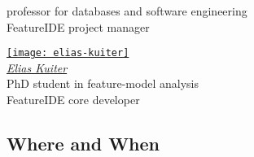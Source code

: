 \begin{frame}{\insertsubsection}
\begin{mycolumns}
{{{					\small professor for databases and software engineering\\[.5ex]
					FeatureIDE project manager
				}
				\parbox{0.45\linewidth}{
					\centering
					\href{https://www.dbse.ovgu.de/Mitarbeiter/Elias+Kuiter.html}{\texttt{[image: elias-kuiter]}}\\[.5ex]
					\href{https://www.dbse.ovgu.de/Mitarbeiter/Elias+Kuiter.html}{\emph{Elias Kuiter}}\\[.5ex]
					\small PhD student in feature-model analysis\\[.5ex]
					FeatureIDE core developer
				}
			}
		}
	\end{mycolumns}
\end{frame}

\subsection{Where and When}

